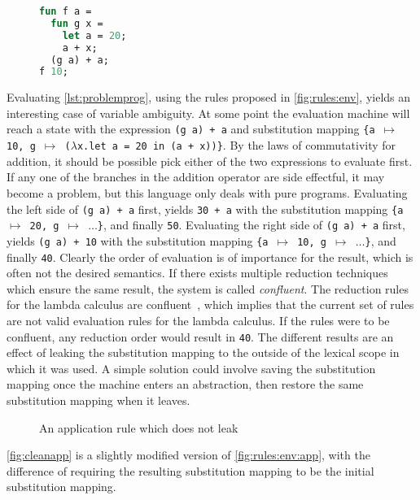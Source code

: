 \documentclass[11pt,oneside,a4paper]{report}
\begin{document}
\begin{figure}[ht]
\begin{lstlisting}[language=ML,caption={Problematic program},label={lst:problemprog},mathescape=true]
fun f a = 
  fun g x = 
    let a = 20;
    a + x;
  (g a) + a;
f 10;
\end{lstlisting}
\end{figure}
Evaluating \autoref{lst:problemprog}, using the rules proposed in \autoref{fig:rules:env}, yields an interesting case of variable ambiguity.
At some point the evaluation machine will reach a state with the expression \texttt{(g a) + a} and substitution mapping \texttt{\{a $\mapsto$ 10, g $\mapsto$ ($\lambda$x.let a = 20 in (a + x))\}}.
By the laws of commutativity for addition, it should be possible pick either of the two expressions to evaluate first.
If any one of the branches in the addition operator are side effectful, it may become a problem, but this language only deals with pure programs.
Evaluating the left side of \texttt{(g a) + a} first, yields \texttt{30 + a} with the substitution mapping \texttt{\{a $\mapsto$ 20, g $\mapsto$ $\dots$\}}, and finally \texttt{50}.
Evaluating the right side of \texttt{(g a) + a} first, yields \texttt{(g a) + 10} with the substitution mapping \texttt{\{a $\mapsto$ 10, g $\mapsto$ $\dots$\}}, and finally \texttt{40}.
Clearly the order of evaluation is of importance for the result, which is often not the desired semantics.
If there exists multiple reduction techniques which ensure the same result, the system is called \textit{confluent}.
The reduction rules for the lambda calculus are confluent~\cite{church1936some}, which implies that the current set of rules are not valid evaluation rules for the lambda calculus.
If the rules were to be confluent, any reduction order would result in \texttt{40}.
The different results are an effect of leaking the substitution mapping to the outside of the lexical scope in which it was used.
A simple solution could involve saving the substitution mapping once the machine enters an abstraction, then restore the same substitution mapping when it leaves.
\begin{figure}[ht]
    \begin{mdframed}[style=style1]
        \vspace*{0.4cm}
          \begin{prooftree}
          \end{prooftree}   
    \end{mdframed}
    \caption{An application rule which does not leak}
    \label{fig:cleanapp}
\end{figure}
\noindent \autoref{fig:cleanapp} is a slightly modified version of \autoref{fig:rules:env:app}, with the difference of requiring the resulting substitution mapping to be the initial substitution mapping.
\end{document}
